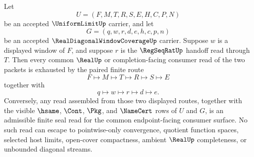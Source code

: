 \begin{theorem}
\label{thm:uniform-limit-finite-window-seal-exhaustion}
Let
$$
U=(F,M,T,R,S,E,H,C,P,N)
$$
be an accepted $\UniformLimitUp$ carrier, and let
$$
G=(q,w,r,d,e,h,c,p,n)
$$
be an accepted $\RealDiagonalWindowCoverageUp$ carrier. Suppose $w$ is a displayed window of $F$, and suppose $r$ is the $\RegSeqRatUp$ handoff read through $T$. Then every common $\RealUp$ or completion-facing consumer read of the two packets is exhausted by the paired finite route
$$
F \longmapsto M \longmapsto T \longmapsto R \longmapsto S \longmapsto E
$$
together with
$$
q \longmapsto w \longmapsto r \longmapsto d \longmapsto e.
$$
Conversely, any read assembled from those two displayed routes, together with the visible $\hsame$, $\Cont$, $\Pkg$, and $\NameCert$ rows of $U$ and $G$, is an admissible finite seal read for the common endpoint-facing consumer surface. No such read can escape to pointwise-only convergence, quotient function spaces, selected host limits, open-cover compactness, ambient $\RealUp$ completeness, or unbounded diagonal streams.
\end{theorem}
